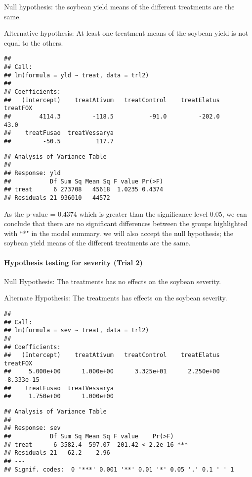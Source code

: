 \documentclass[
]{article}
\begin{document}
Null hypothesis: the soybean yield means of the different treatments are
the same.

Alternative hypothesis: At least one treatment means of the soybean
yield is not equal to the others.

\begin{verbatim}
## 
## Call:
## lm(formula = yld ~ treat, data = trl2)
## 
## Coefficients:
##   (Intercept)    treatAtivum   treatControl    treatElatus       treatFOX  
##        4114.3         -118.5          -91.0         -202.0           43.0  
##    treatFusao  treatVessarya  
##         -50.5          117.7
\end{verbatim}

\begin{verbatim}
## Analysis of Variance Table
## 
## Response: yld
##           Df Sum Sq Mean Sq F value Pr(>F)
## treat      6 273708   45618  1.0235 0.4374
## Residuals 21 936010   44572
\end{verbatim}

As the p-value = 0.4374 which is greater than the significance level
0.05, we can conclude that there are no significant differences between
the groups highlighted with ``*" in the model summary. we will also
accept the null hypothesis; the soybean yield means of the different
treatments are the same.

\hypertarget{hypothesis-testing-for-severity-trial-2}{%
\paragraph{Hypothesis testing for severity (Trial
2)}\label{hypothesis-testing-for-severity-trial-2}}

Null Hypothesis: The treatments has no effects on the soybean severity.

Alternate Hypothesis: The treatments has effects on the soybean
severity.

\begin{verbatim}
## 
## Call:
## lm(formula = sev ~ treat, data = trl2)
## 
## Coefficients:
##   (Intercept)    treatAtivum   treatControl    treatElatus       treatFOX  
##     5.000e+00      1.000e+00      3.325e+01      2.250e+00     -8.333e-15  
##    treatFusao  treatVessarya  
##     1.750e+00      1.000e+00
\end{verbatim}

\begin{verbatim}
## Analysis of Variance Table
## 
## Response: sev
##           Df Sum Sq Mean Sq F value    Pr(>F)    
## treat      6 3582.4  597.07  201.42 < 2.2e-16 ***
## Residuals 21   62.2    2.96                      
## ---
## Signif. codes:  0 '***' 0.001 '**' 0.01 '*' 0.05 '.' 0.1 ' ' 1
\end{verbatim}
\end{document}
